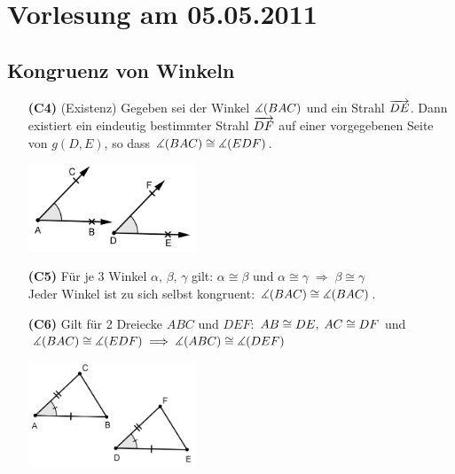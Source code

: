 \section*{Vorlesung am 05.05.2011}

\subsection*{Kongruenz von Winkeln}

\begin{enumerate}
    \item[{\bf(C4)}] (Existenz) Gegeben sei der Winkel $\mbox{$\measuredangle$}(BAC)$ und ein Strahl $\mbox{${\overrightarrow{DE}}$}$. Dann
        existiert ein eindeutig bestimmter Strahl $\mbox{${\overrightarrow{DF}}$}$ auf einer vorgegebenen Seite von
        $g(D,E)$, so dass $\mbox{$\measuredangle$}(BAC) \cong \mbox{$\measuredangle$}(EDF)$.

        \centerline{\includegraphics[width=5cm]{BILDER/1-2-08-C4.png}}

    \item[{\bf(C5)}] Für je 3 Winkel $\alpha,\, \beta,\, \gamma$ gilt: $\alpha \cong \beta$ und
        $\alpha \cong \gamma\; \Longrightarrow\; \beta \cong \gamma$\\


        Jeder Winkel ist zu sich selbst kongruent: $\mbox{$\measuredangle$}(BAC) \cong \mbox{$\measuredangle$}(BAC)$.

    \item[{\bf(C6)}] Gilt für 2 Dreiecke $ABC$ und $DEF$: ${AB} \cong {DE},\; {AC} \cong
        {DF}$ und $\mbox{$\measuredangle$}(BAC) \cong \mbox{$\measuredangle$}(EDF)\; \Longrightarrow\; \mbox{$\measuredangle$}(ABC) \cong \mbox{$\measuredangle$}(DEF)$


    \centerline{\includegraphics[width=5cm]{BILDER/1-2-08-C6.png}}
\end{enumerate}

